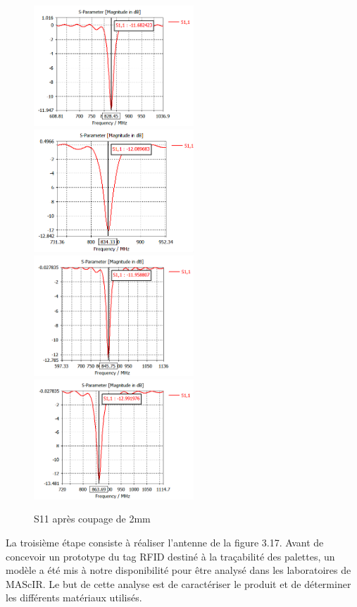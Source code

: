 \documentclass[11pt, a4paper, twoside]{book}
\begin{document}
\begin{figure}[H]
\centering
\includegraphics[width=6cm]{11}
\includegraphics[width=6cm]{22}\\
\includegraphics[width=6cm]{33}
\includegraphics[width=6cm]{44}
\caption{S11 après coupage de 2mm }
\end{figure}

La troisième étape  consiste à réaliser l'antenne de la figure 3.17. 
Avant de concevoir un prototype du tag RFID destiné à la traçabilité des palettes, un modèle a été mis à notre disponibilité pour être analysé dans les laboratoires de MAScIR. Le but de cette analyse est de caractériser le produit et de déterminer les différents matériaux utilisés.\\
\end{document}
